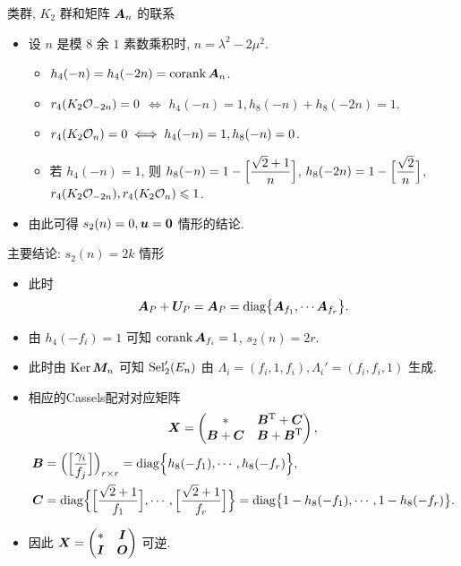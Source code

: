 \documentclass[aspectratio=169,handout]{ctexbeamer}
\renewcommand\aleg[2]{\Bigl[\dfrac{{#1}}{#2}\Bigr]}
\begin{document}
\begin{frame}{类群, $K_2$ 群和矩阵 ${\boldsymbol{A}}_n$ 的联系}
  \begin{itemize}
    \item 设 $n$ 是模 $8$ 余 $1$ 素数乘积时, $n=\lambda^2-2\mu^2$.
    \begin{itemize}
      \item $h_4(-n)=h_4(-2n)=\operatorname{corank}{\boldsymbol{A}}_n$.
      \item $r_4(K_2{\mathcal{O}}_{-2n})=0$ $\iff$ $h_4(-n)=1,h_8(-n)+h_8(-2n)=1$.
      \item $r_4(K_2{\mathcal{O}}_n)=0\iff h_4(-n)=1,h_8(-n)=0$.
      \item 若 $h_4(-n)=1$, 则 $h_8(-n)=1-\aleg{\sqrt2+1}{n}$,  $h_8(-2n)=1-\aleg{\sqrt2}{n}$, $r_4(K_2{\mathcal{O}}_{-2n}),r_4(K_2{\mathcal{O}}_n)\leqslant 1$.
    \end{itemize}
    \item 由此可得 $s_2(n)=0,{\boldsymbol{u}}={\bf0}$ 情形的结论.
  \end{itemize}
\end{frame}


\begin{frame}{主要结论: $s_2(n)=2k$ 情形}
  \begin{itemize}
    \item 此时
    \[
      {\boldsymbol{A}}_P+{\boldsymbol{U}}_P={\boldsymbol{A}}_P={\mathrm{diag}}\bigl\{
        {\boldsymbol{A}}_{f_1},\cdots {\boldsymbol{A}}_{f_r}
      \bigr\}.
    \]
    \item 由 $h_4(-f_i)=1$ 可知 $\operatorname{corank} {\boldsymbol{A}}_{f_i}=1$, $s_2(n)=2r$.
    \item 此时由 $\operatorname{Ker}{\boldsymbol{M}}_n$ 可知 ${\mathrm{Sel}}_2'(E_n)$ 由 $\Lambda_i=(f_i,1,f_i),\Lambda_i'=(f_i,f_i,1)$ 生成.
    \item 相应的Cassels配对对应矩阵
    \[
      {\boldsymbol{X}}=\begin{pmatrix}
        *&{\boldsymbol{B}}^{\mathrm{T}}+{\boldsymbol{C}}\\{\boldsymbol{B}}+{\boldsymbol{C}}&{\boldsymbol{B}}+{\boldsymbol{B}}^{\mathrm{T}}
      \end{pmatrix},
    \]
    \begin{align*}
      \bfB&
      =\Bigl(\aleg{\gamma_i}{f_j}\Bigr)_{r\times r}
      =\diag\Bigl\{h_8(-f_1),\cdots,h_8(-f_r)\Bigr\},\\
      \bfC&
      =\diag\Bigl\{\aleg{\sqrt2+1}{f_1},\cdots,\aleg{\sqrt2+1}{f_r}\Bigr\}
      =\diag\bigl\{1-h_8(-f_1),\cdots,1-h_8(-f_r)\bigr\}.
    \end{align*}
    \item 因此 ${\boldsymbol{X}}=\begin{pmatrix}
      *&{\boldsymbol{I}}\\{\boldsymbol{I}}&{\boldsymbol{O}}
    \end{pmatrix}$ 可逆.
  \end{itemize}
\end{frame}
\end{document}

